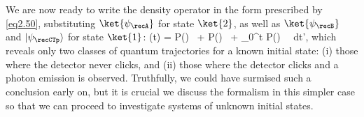We are now ready to write the density operator in the form prescribed by \eqref{eq2.50}, substituting $\ket{\psi_{\recA}}$ for state $\ket{2}$, as well as $\ket{\psi_{\recB}}$ and $\lvert \psi_{\recCTp} \rangle$ for state $\ket{1}$:
%
\be \rho(t) = P(\recA) \, \ket{\psi_{\recA}} \bra{\psi_{\recA}} + P(\recB) \, \ket{\psi_{\recB}} \bra{\psi_{\recB}} + \int_0^t P(\recCTp) \, \ket{\psi_{\recCTp}} \bra{\psi_{\recCTp}} \, dt', \label{eq2.63} \ee
%
which reveals only two classes of quantum trajectories for a known initial state: (i) those where the detector never clicks, and (ii) those where the detector clicks and a photon emission is observed. Truthfully, we could have surmised such a conclusion early on, but it is crucial we discuss the formalism in this simpler case so that we can proceed to investigate systems of unknown initial states.


